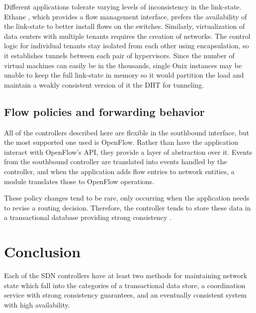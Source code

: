 \documentclass[letterpaper,twocolumn,10pt]{article}
\begin{document}
Different applications tolerate varying levels of inconsistency in the link-state. Ethane \cite{koponen2010onix}, which provides a flow management interface, prefers the availability of the link-state to better install flows on the switches. Similarly, virtualization of data centers with multiple tenants requires the creation of networks. The control logic for individual tenants stay isolated from each other using encapsulation, so it establishes tunnels between each pair of hypervisors. Since the number of virtual machines can easily be in the thousands, single Onix instances may be unable to keep the full link-state in memory so it would partition the load and maintain a weakly consistent version of it the DHT for tunneling.

\subsection*{Flow policies and forwarding behavior}

All of the controllers described here are flexible in the southbound interface, but the most supported one used is OpenFlow. Rather than have the application interact with OpenFlow's API, they provide a layer of abstraction over it. Events from the southbound controller are translated into events handled by the controller, and when the application adds flow entries to network entities, a module translates those to OpenFlow operations. 

These policy changes tend to be rare, only occurring when the application needs to revise a routing decision. Therefore, the controller tends to store these data in a transactional database providing strong consistency \cite{koponen2010onix}.


\section{Conclusion}

Each of the SDN controllers have at least two methods for maintaining network state which fall into the categories of a transactional data store, a coordination service with strong consistency guarantees, and an eventually consistent system with high availability. 
\end{document}
